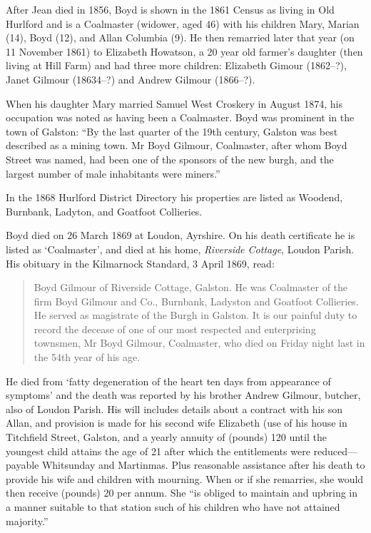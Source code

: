After Jean died in 1856, Boyd is shown in the 1861 Census as living in Old Hurlford and is a Coalmaster (widower, aged 46) with his children Mary, Marian (14), Boyd (12), and Allan Columbia (9). He then remarried later that year (on 11 November 1861) to Elizabeth Howatson, a 20 year old farmer's daughter (then living at Hill Farm) and had three more children: Elizabeth Gimour (1862--?), Janet Gilmour (18634--?) and Andrew Gilmour (1866--?).

When his daughter Mary married Samuel West Croskery in August 1874, his occupation was noted as having been a Coalmaster.\cite{SMWCmarriage}
Boyd was prominent in the town of Galston: ``By the last quarter of the 19th century, Galston was best described as a mining town. Mr Boyd Gilmour, Coalmaster, after whom Boyd Street was named, had been one of the sponsors of the new burgh, and the largest number of male inhabitants were miners.''\cite{BGilmourGalston}

In the 1868 Hurlford District Directory his properties are listed as Woodend, Burnbank, Ladyton, and Goatfoot Collieries.

Boyd died on 26 March 1869 at Loudon, Ayrshire. \cite{BGilmourDeath} On his death certificate he is listed as `Coalmaster', and died at his home, \emph{Riverside Cottage}, Loudon Parish. His obituary in the Kilmarnock Standard, 3 April 1869, read:\cite{BGobituary}

\begin{quotation}
Boyd Gilmour of Riverside Cottage, Galston. He was Coalmaster of the firm Boyd Gilmour and Co., Burnbank, Ladyston and Goatfoot Collieries. He served as magistrate of the Burgh in Galston. It is our painful duty to record the decease of one of our most respected and enterprising townsmen, Mr Boyd Gilmour, Coalmaster, who died on Friday night last in the 54th year of his age.
\end{quotation}

He died from `fatty degeneration of the heart ten days from appearance of symptoms' and the death was reported by his brother Andrew Gilmour, butcher, also of Loudon Parish. His will includes details about a contract with his son Allan, and provision is made for his second wife Elizabeth (use of his house in Titchfield Street, Galston, and a yearly annuity of (pounds) 120 until the youngest child attains the age of 21 after which the entitlements were reduced---payable Whitsunday and Martinmas. Plus reasonable assistance after his death to provide his wife and children with mourning. When or if she remarries, she would then receive (pounds) 20 per annum. She ``is obliged to maintain and upbring in a manner suitable to that station such of his children who have not attained majority.''

